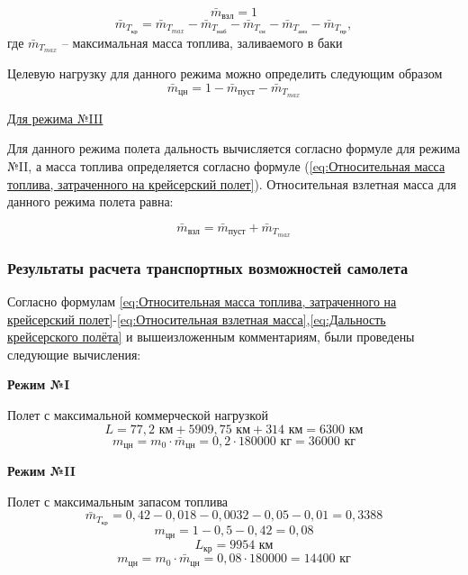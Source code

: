 $$\bar{m}_\text{взл} = 1$$
\begin{equation}
    \label{eq:Относительная масса топлива, затраченного на крейсерский полет}
    \bar{m}_{T_\text{кр}} = \bar{m}_{T_{max}} - \bar{m}_{T_\text{наб}} -\bar{m}_{T_\text{сн}} -\bar{m}_{T_\text{анз}} - \bar{m}_{T_\text{пр}},
\end{equation}
где $\bar{m}_{T_{max}}$ -- максимальная масса топлива, заливаемого в баки

Целевую нагрузку для данного режима можно определить следующим образом
\begin{equation}
    \label{eq:Целевая нагрузка}
    \bar{m}_\text{цн} = 1 - \bar{m}_\text{пуст} - \bar{m}_{T_{max}}
\end{equation}

\underline{Для режима №III}

Для данного режима полета дальность вычисляется согласно формуле для режима №II, а масса топлива определяется согласно формуле (\ref{eq:Относительная масса топлива, затраченного на крейсерский полет}). Относительная взлетная масса для данного режима полета равна:

\begin{equation}
    \label{eq:Относительная взлетная масса}
    \bar{m}_\text{взл} = \bar{m}_\text{пуст} + \bar{m}_{T_{max}} 
\end{equation}

\subsubsection{Результаты расчета транспортных возможностей самолета}
\label{sec:Результаты расчета транспортных возможностей самолета}

Согласно формулам \ref{eq:Относительная масса топлива, затраченного на крейсерский полет}-\ref{eq:Относительная взлетная масса},\ref{eq:Дальность крейсерского полёта} и вышеизложенным комментариям, были
проведены следующие вычисления:

\textbf{Режим №I}

Полет с максимальной коммерческой нагрузкой 
$$L = 77,2 \text{ км} + 5909,75 \text{ км} + 314 \text{ км} = 6300 \text{ км}$$
$$m_\text{цн} = m_0 \cdot \bar{m}_\text{цн} = 0,2 \cdot 180000 \text{ кг}= 36 000 \text{ кг}$$ 

\textbf{Режим №II}

Полет с максимальным запасом топлива 
$$\bar{m}_{T_\text{кр}} = 0,42 - 0,018 - 0,0032 - 0,05 - 0,01 = 0,3388$$
$$m_\text{цн} = 1 - 0,5 - 0,42 = 0,08$$
$$L_\text{кр} = 9954 \text{ км}$$
$$m_\text{цн} = m_0 \cdot \bar{m}_\text{цн} = 0,08 \cdot 180000 = 14400 \text{ кг}$$

